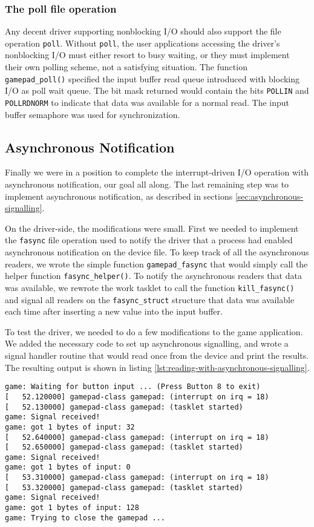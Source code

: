 \subsubsection{The poll file operation}
Any decent driver supporting nonblocking I/O should also support the file operation \texttt{poll}. Without \texttt{poll}, the user applications accessing the driver's nonblocking I/O must either resort to busy waiting, or they must implement their own polling scheme, not a satisfying situation. The function \texttt{gamepad\_poll()} specified the input buffer read queue introduced with blocking I/O as poll wait queue. The bit mask returned would contain the bits \texttt{POLLIN} and \texttt{POLLRDNORM} to indicate that data was available for a normal read. The input buffer semaphore was used for synchronization.

\subsection{Asynchronous Notification}
Finally we were in a position to complete the interrupt-driven I/O operation with asynchronous notification, our goal all along. The last remaining step was to implement asynchronous notification, as described in sections \ref{sec:asynchronous-signalling}.

On the driver-side, the modifications were small. First we needed to implement the \texttt{fasync} file operation used to notify the driver that a process had enabled asynchronous notification on the device file. To keep track of all the asynchronous readers, we wrote the simple function \texttt{gamepad\_fasync} that would simply call the helper function \texttt{fasync\_helper()}. To notify the asynchronous readers that data was available, we rewrote the work tasklet to call the function \texttt{kill\_fasync()} and signal all readers on the \texttt{fasync\_struct} structure that data was available each time after inserting a new value into the input buffer.

To test the driver, we needed to do a few modifications to the game application. We added the necessary code to set up asynchronous signalling, and wrote a signal handler routine that would read once from the device and print the results. The resulting output is shown in listing \ref{lst:reading-with-asynchronous-signalling}.
\begin{lstlisting}[caption=Reading with asynchronous signalling.,label=lst:reading-with-asynchronous-signalling]
game: Waiting for button input ... (Press Button 8 to exit)
[   52.120000] gamepad-class gamepad: (interrupt on irq = 18)
[   52.130000] gamepad-class gamepad: (tasklet started)
game: Signal received!
game: got 1 bytes of input: 32
[   52.640000] gamepad-class gamepad: (interrupt on irq = 18)
[   52.650000] gamepad-class gamepad: (tasklet started)
game: Signal received!
game: got 1 bytes of input: 0
[   53.310000] gamepad-class gamepad: (interrupt on irq = 18)
[   53.320000] gamepad-class gamepad: (tasklet started)
game: Signal received!
game: got 1 bytes of input: 128
game: Trying to close the gamepad ...
\end{lstlisting}



